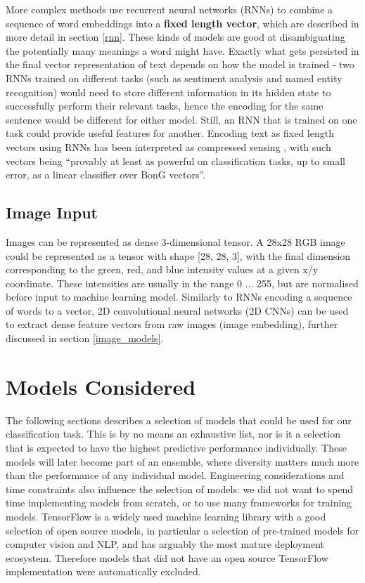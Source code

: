More complex methods use recurrent neural networks (RNNs) to combine a sequence of word embeddings  into a \textbf{fixed length vector},  which are described in more detail in section \ref{rnn}.
These kinds of models are good at  disambiguating the potentially many meanings a word might have.
Exactly what gets persisted in the final  vector representation of text depends on how the model is trained - two RNNs  trained on different tasks (such as sentiment analysis and named entity recognition)  would need to store different information in its hidden state to successfully  perform their relevant tasks,  hence the encoding for the same sentence would be different for either model.
Still, an RNN  that is trained on one task could provide useful features for another.
Encoding text as fixed length vectors using RNNs has been interpreted as compressed sensing \cite{compressed_sensing_rnn}, with such vectors being ``provably at least as powerful on classification tasks, up to small error, as a linear classifier over BonG vectors''.

\subsection{Image Input}

Images can be represented as dense 3-dimensional tensor.
A 28x28 RGB image could be represented as a tensor with shape [28, 28, 3],  with the final dimension corresponding to the green, red, and blue intensity values at a given x/y coordinate.
These intensities  are usually in the range 0 ... 255, but are normalised before input to machine learning model.
Similarly to RNNs  encoding a sequence of words to a vector, 2D convolutional neural networks (2D CNNs)  can be used to extract dense feature vectors from raw images (image embedding),  further discussed in section \ref{image_models}.

\section{Models Considered}
\label{models_considered}

The following sections describes a selection of models that could be used for our classification task.
This is by no means an exhaustive list, nor is it a selection that is expected to have the highest predictive performance individually.
These models will later become part of an ensemble, where diversity matters much more than the performance of any individual model.
Engineering  considerations and time constraints also influence the selection of models: we did not want to spend time implementing models from scratch, or to use many frameworks for training models.
TensorFlow  is a widely used machine learning library with a good selection of open source models, in particular a selection of pre-trained models for computer vision and NLP, and has arguably the most mature deployment ecosystem.
Therefore models that did not have an open source TensorFlow implementation were automatically excluded.

